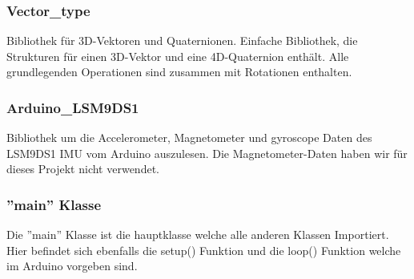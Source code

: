 \subsubsection{Vector\_type}
Bibliothek für 3D-Vektoren und Quaternionen. Einfache Bibliothek, die Strukturen für einen 3D-Vektor und eine 4D-Quaternion enthält. Alle grundlegenden Operationen sind zusammen mit Rotationen enthalten.

\subsubsection{Arduino\_LSM9DS1}
Bibliothek um die Accelerometer, Magnetometer und gyroscope Daten des LSM9DS1 IMU vom Arduino auszulesen. Die Magnetometer-Daten haben wir für dieses Projekt nicht verwendet.


\subsubsection{''main'' Klasse}
Die ''main'' Klasse ist die hauptklasse welche alle anderen Klassen Importiert. Hier befindet sich ebenfalls die setup() Funktion und die loop() Funktion welche im Arduino vorgeben sind.

